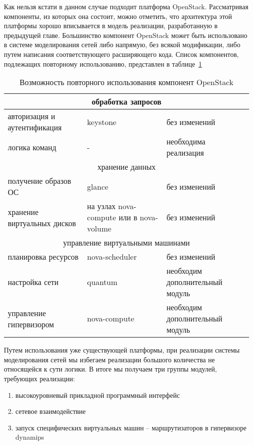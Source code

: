 Как нельзя кстати в данном случае подходит платформа OpenStack. Рассматривая компоненты,
из которых она состоит, можно отметить, что архитектура этой платформы хорошо вписывается
в модель реализации, разработанную в предыдущей главе.
Большинство компонент OpenStack может быть использовано в 
системе моделирования сетей либо напрямую, без всякой модификации, либо путем
написания соответствующего расширяющего кода. Список компонентов, подлежащих
повторному использованию, представлен в таблице~\ref{tab:openstack-reuse}
\begin{table}
\center
\caption{Возможность повторного использования компонент OpenStack}
\label{tab:openstack-reuse}
\begin{tabular}{|p{5cm}|p{4cm}|p{5cm}|} \hline 
\multicolumn{3}{|c|}{обработка запросов} \\ \hline 
авторизация и аутентификация & keystone & без изменений\\ \hline
логика команд & - & необходима реализация \\ \hline
\multicolumn{3}{|c|}{хранение данных} \\ \hline
получение образов ОС & glance & без изменений \\ \hline
хранение виртуальных дисков & на узлах nova-compute или в nova-volume & без изменений\\ \hline
\multicolumn{3}{|c|}{управление виртуальными машинами} \\ \hline
планировка ресурсов & nova-scheduler & без изменений \\ \hline
настройка сети & quantum & необходим дополнительный модуль \\ \hline
управление гипервизором & nova-compute & необходим дополнительный модуль \\ \hline
\hline 
\end{tabular} 
\end{table}

Путем использования уже существующей платформы, при реализации системы моделирования
сетей мы избегаем реализации большого количества не относящейся к сути логики. В итоге мы
получаем три группы модулей, требующих реализации:
\begin{enumerate}
    \item высокоуровневый прикладной программный интерфейс
    \item сетевое взаимодействие
    \item запуск специфических виртуальных машин -- маршрутизаторов в гипервизоре dynamips
\end{enumerate}


